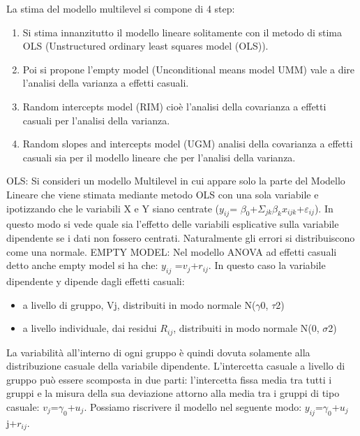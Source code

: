 \documentclass[a4page, 11pt]{article}
\begin{document}
La stima del modello multilevel si compone di 4 step:
\begin{enumerate}[noitemsep]
\item Si stima innanzitutto il modello lineare solitamente con il metodo di stima OLS (Unstructured ordinary least squares model (OLS)).
\item Poi si propone l’empty model (Unconditional means model UMM) vale a dire l’analisi della varianza a effetti casuali.
\item Random intercepts model (RIM) cioè l’analisi della covarianza a effetti casuali per l’analisi della varianza.
\item Random slopes and intercepts model (UGM) analisi della covarianza a effetti casuali sia per il modello lineare che per l’analisi della varianza.
\end{enumerate}
OLS: 
Si consideri un modello Multilevel in cui appare solo la parte del Modello Lineare che viene stimata mediante metodo OLS con una sola variabile e ipotizzando che le variabili X e Y siano centrate ($y_{ij}$= $\beta_0$+$\Sigma_{jk}$$\beta_k$$x_{ijk}$+$\varepsilon_{ij}$).
\newline
In questo modo si vede quale sia l’effetto delle variabili esplicative sulla variabile dipendente se i dati non fossero centrati. Naturalmente gli errori si distribuiscono come una normale. 
\newline
\newline
EMPTY MODEL:
Nel modello ANOVA ad effetti casuali detto anche empty model si ha che: $y_{ij}$ =$v_j$+$r_{ij}$.
In questo caso la variabile dipendente y dipende dagli effetti casuali:
\begin{itemize}
\item a livello di gruppo, Vj, distribuiti in modo normale N($\gamma$0, $\tau$2)
\item a livello individuale, dai residui $R_{ij}$, distribuiti in modo normale N(0, $\sigma$2) 
\end{itemize}
La variabilità all’interno di ogni gruppo è quindi dovuta solamente alla distribuzione casuale della variabile dipendente.
\newline
L’intercetta casuale a livello di gruppo può essere scomposta in due parti: l’intercetta fissa media tra tutti i gruppi e la misura della sua deviazione attorno alla media tra i gruppi di tipo casuale: $v_j$=$\gamma_0$+$u_j$.
\newline
Possiamo riscrivere il modello nel seguente modo: $y_{ij}$=$\gamma_0$+$u_j$j+$r_{ij}$.
\newline
\end{document}
